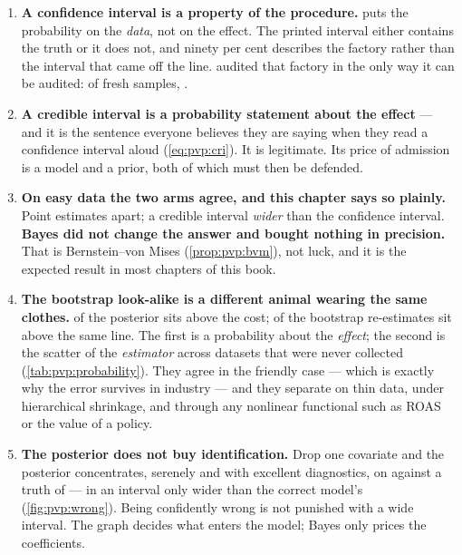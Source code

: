 \begin{enumerate}[leftmargin=*, itemsep=.45em]
  \item \textbf{A confidence interval is a property of the procedure.}  puts
        the probability on the \emph{data}, not on the effect. The printed interval either contains
        the truth or it does not, and ninety per cent describes the factory rather than the
        interval that came off the line.  audited that factory in the only way it can be
        audited: \nbZeroAipwCovered{} of \nbZeroNSeeds{} fresh samples, \pc{\nbZeroAipwCovPct}.

  \item \textbf{A credible interval is a probability statement about the effect} --- and it is the
        sentence everyone believes they are saying when they read a confidence interval aloud
        (\cref{eq:pvp:cri}). It is legitimate. Its price of admission is a model and a prior, both
        of which must then be defended.

  \item \textbf{On easy data the two arms agree, and this chapter says so plainly.} Point estimates
        \eur{\nbZeroEstGap} apart; a credible interval \pc{\nbZeroWidthRatioPct} \emph{wider} than the
        confidence interval. \textbf{Bayes did not change the answer and bought nothing in
        precision.} That is Bernstein--von Mises (\cref{prop:pvp:bvm}), not luck, and it is the
        expected result in most chapters of this book.

  \item \textbf{The bootstrap look-alike is a different animal wearing the same clothes.}
        \nbZeroPPays{} of the posterior sits above the cost; \nbZeroBootShare{} of the bootstrap
        re-estimates sit above the same line. The first is a probability about the \emph{effect};
        the second is the scatter of the \emph{estimator} across datasets that were never collected
        (\cref{tab:pvp:probability}). They agree in the friendly case --- which is exactly why the
        error survives in industry --- and they separate on thin data, under hierarchical shrinkage,
        and through any nonlinear functional such as ROAS or the value of a policy.

  \item \textbf{The posterior does not buy identification.} Drop one covariate and the posterior
        concentrates, serenely and with excellent diagnostics, on \eur{\nbZeroNoadjMean} against a
        truth of \eur{\nbZeroTrueDag} --- in an interval only \pc{\nbZeroNoadjWiderPct} wider than
        the correct model's (\cref{fig:pvp:wrong}). Being confidently wrong is not punished with a
        wide interval. The graph decides what enters the model; Bayes only prices the coefficients.


\end{enumerate}
